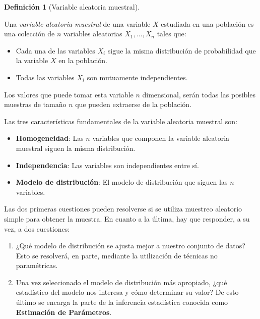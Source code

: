 \documentclass[
  spanish,
  a4paper,
]{scrreport}
\providecommand{\tightlist}{%
  \setlength{\itemsep}{0pt}\setlength{\parskip}{0pt}}
\theoremstyle{plain}
\theoremstyle{definition}
\theoremstyle{definition}
\newtheorem{definition}{Definición}[chapter]
\theoremstyle{remark}
\begin{document}
\begin{definition}[Variable aleatoria
muestral]\protect\hypertarget{def-variable-aleatoria-muestral}{}\label{def-variable-aleatoria-muestral}

Una \emph{variable aleatoria muestral} de una variable \(X\) estudiada
en una población es una colección de \(n\) variables aleatorias
\(X_1,\ldots,X_n\) tales que:

\begin{itemize}
\tightlist
\item
  Cada una de las variables \(X_i\) sigue la misma distribución de
  probabilidad que la variable \(X\) en la población.
\item
  Todas las variables \(X_i\) son mutuamente independientes.
\end{itemize}

\end{definition}

Los valores que puede tomar esta variable \(n\) dimensional, serán todas
las posibles muestras de tamaño \(n\) que pueden extraerse de la
población.

Las tres características fundamentales de la variable aleatoria muestral
son:

\begin{itemize}
\item
  \textbf{Homogeneidad}: Las \(n\) variables que componen la variable
  aleatoria muestral siguen la misma distribución.
\item
  \textbf{Independencia}: Las variables son independientes entre sí.
\item
  \textbf{Modelo de distribución}: El modelo de distribución que siguen
  las \(n\) variables.
\end{itemize}

Las dos primeras cuestiones pueden resolverse si se utiliza muestreo
aleatorio simple para obtener la muestra. En cuanto a la última, hay que
responder, a su vez, a dos cuestiones:

\begin{enumerate}
\def\labelenumi{\arabic{enumi}.}
\tightlist
\item
  ¿Qué modelo de distribución se ajusta mejor a nuestro conjunto de
  datos? Esto se resolverá, en parte, mediante la utilización de
  técnicas no paramétricas.
\item
  Una vez seleccionado el modelo de distribución más apropiado, ¿qué
  estadístico del modelo nos interesa y cómo determinar su valor? De
  esto último se encarga la parte de la inferencia estadística conocida
  como \textbf{Estimación de Parámetros}.
\end{enumerate}
\end{document}
